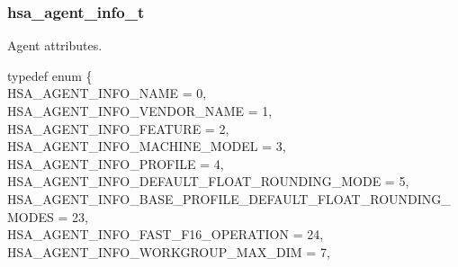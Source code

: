 \documentclass[final,oneside]{book}
\newcommand{\reftyp}[1]{#1}
\newcommand{\refenu}[1]{\reftyp{#1}}
\newenvironment{mylongtable}{\rowcolors{0}{lightgray}{lightgray}\longtable} {
\endlongtable}
\begin{document}
\subsubsection{hsa_\-agent_\-info_\-t}
\vspace{-2.5mm}Agent attributes.\begin{mylongtable}{@{}p{\textwidth}}
\rule{0pt}{3ex}typedef enum \{\\\hspace{1.7em}\hypertarget{group__agentinfo_1gga39d0684207d95717d96319573b3e4a42a06b3ca6080e3bfd4d5b07db91d766e4c}{\refenu{HSA_\-AGENT_\-INFO_\-NAME}} = 0,\\
\hspace{1.7em}\hypertarget{group__agentinfo_1gga39d0684207d95717d96319573b3e4a42ac9e0c3d4f881d6de12ff8792eb92292c}{\refenu{HSA_\-AGENT_\-INFO_\-VENDOR_\-NAME}} = 1,\\
\hspace{1.7em}\hypertarget{group__agentinfo_1gga39d0684207d95717d96319573b3e4a42a4ce35a53f20e53b76c7cc7697f08ea04}{\refenu{HSA_\-AGENT_\-INFO_\-FEATURE}} = 2,\\
\hspace{1.7em}\hypertarget{group__agentinfo_1gga39d0684207d95717d96319573b3e4a42a5f62c238148161421e91c90552a39f46}{\refenu{HSA_\-AGENT_\-INFO_\-MACHINE_\-MODEL}} = 3,\\
\hspace{1.7em}\hypertarget{group__agentinfo_1gga39d0684207d95717d96319573b3e4a42acc8a260a87cb3fb811e29b8b13fabc4f}{\refenu{HSA_\-AGENT_\-INFO_\-PROFILE}} = 4,\\
\hspace{1.7em}\hypertarget{group__agentinfo_1gga39d0684207d95717d96319573b3e4a42aa43711135cff370be22a717d0cae97e5}{\refenu{HSA_\-AGENT_\-INFO_\-DEFAULT_\-FLOAT_\-ROUNDING_\-MODE}} = 5,\\
\hspace{1.7em}\hypertarget{group__agentinfo_1gga39d0684207d95717d96319573b3e4a42a042093edf4aca614608bda8efbcbcf5a}{\refenu{HSA_\-AGENT_\-INFO_\-BASE_\-PROFILE_\-DEFAULT_\-FLOAT_\-ROUNDING_\-MODES}} = 23,\\
\hspace{1.7em}\hypertarget{group__agentinfo_1gga39d0684207d95717d96319573b3e4a42a24a0540e814290a4058700bab43cc321}{\refenu{HSA_\-AGENT_\-INFO_\-FAST_\-F16_\-OPERATION}} = 24,\\
\hspace{1.7em}\hypertarget{group__agentinfo_1gga39d0684207d95717d96319573b3e4a42a595eea133327c6c6110c02a0661a06d6}{\refenu{HSA_\-AGENT_\-INFO_\-WORKGROUP_\-MAX_\-DIM}} = 7,\\

\end{mylongtable}
\end{document}
